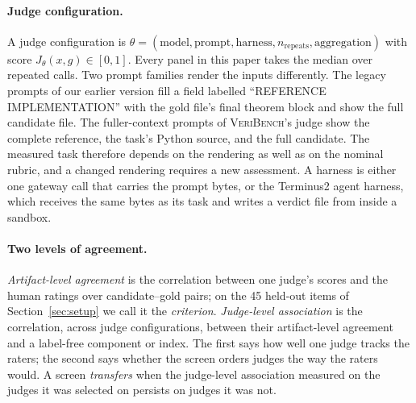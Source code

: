 \paragraph{Judge configuration.}
A judge configuration is $\theta=(\text{model},\text{prompt},\text{harness},n_{\mathrm{repeats}},\text{aggregation})$ with score $J_\theta(x,g)\in[0,1]$.
Every panel in this paper takes the median over repeated calls.
Two prompt families render the inputs differently.
The legacy prompts of our earlier version fill a field labelled ``REFERENCE IMPLEMENTATION'' with the gold file's final theorem block and show the full candidate file.
The fuller-context prompts of \textsc{VeriBench}'s judge show the complete reference, the task's Python source, and the full candidate.
The measured task therefore depends on the rendering as well as on the nominal rubric, and a changed rendering requires a new assessment.
A harness is either one gateway call that carries the prompt bytes, or the Terminus2 agent harness, which receives the same bytes as its task and writes a verdict file from inside a sandbox.

\paragraph{Two levels of agreement.}
\emph{Artifact-level agreement} is the correlation between one judge's scores and the human ratings over candidate--gold pairs; on the 45 held-out items of Section~\ref{sec:setup} we call it the \emph{criterion}.
\emph{Judge-level association} is the correlation, across judge configurations, between their artifact-level agreement and a label-free component or index.
The first says how well one judge tracks the raters; the second says whether the screen orders judges the way the raters would.
A screen \emph{transfers} when the judge-level association measured on the judges it was selected on persists on judges it was not.
